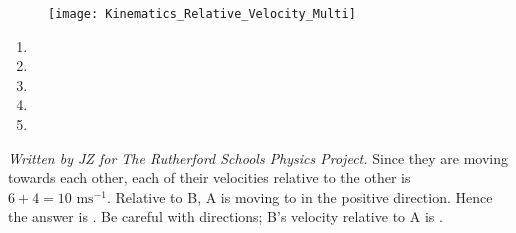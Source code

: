 
\begin{problem} 
{ 

\begin{figure}[h]
	\centering
	\texttt{[image: Kinematics\_Relative\_Velocity\_Multi]}
	\caption{}
	\label{fig:Kinematics_Relative_Velocity_Multi}
\end{figure}

\begin{enumerate}
	\item {}
	\item  {}
	\item  {}
	\item  {}
	\item  {}\correct
\end{enumerate}
}
{\textit{Written by JZ for The Rutherford Schools Physics Project.}}
{ Since they are moving towards each other, each of their velocities relative to the other is $6+4 =10 \textrm{ ms}^{-1}$. Relative to B, A is moving to in the positive direction. Hence the answer is  . Be careful with directions; B's velocity relative to A is  .
}
\end{problem}